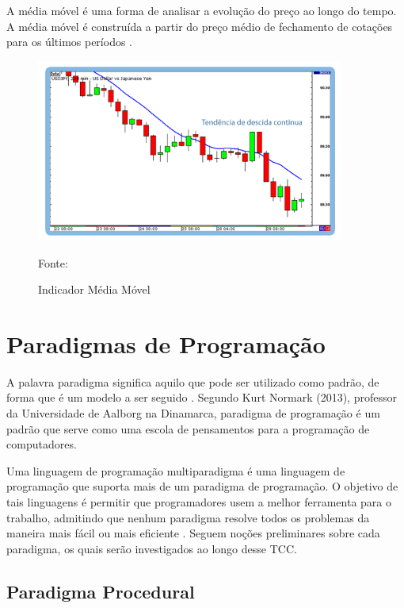 A média móvel é uma forma de analisar a evolução do preço ao longo do tempo. A média móvel é construída a partir do preço médio de fechamento de cotações para os últimos períodos \cite{investforex}.

\begin{figure}[htp]
\centering
\includegraphics[width=0.9\textwidth]{figuras/mediamovel}
\caption{Indicador Média Móvel}{Fonte: } 
\label{mediamovel}
\end{figure}

\section{Paradigmas de Programação}

A palavra paradigma significa aquilo que pode ser utilizado como padrão, de forma que é um modelo a ser seguido \cite{ferreira1986}. Segundo  Kurt Normark (2013), professor da Universidade de Aalborg na Dinamarca, paradigma de programação é um padrão que serve como uma escola de pensamentos para a programação de computadores.



Uma linguagem de programação multiparadigma é uma linguagem de programação que suporta mais de um paradigma de programação. O objetivo de tais linguagens é permitir que programadores usem a melhor ferramenta para o trabalho, admitindo que nenhum paradigma  resolve todos os problemas da maneira mais fácil ou mais eficiente \cite[pág.~21]{paquet2010}. Seguem noções preliminares sobre cada paradigma, os quais serão investigados ao longo desse TCC.

\subsection{Paradigma Procedural}

